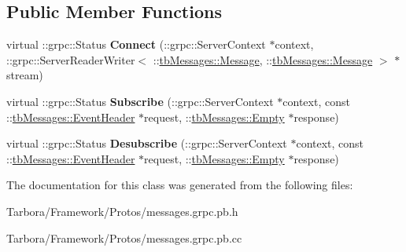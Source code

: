 \subsection*{Public Member Functions}
\begin{DoxyCompactItemize}
\item 
\mbox{\label{classtbMessages_1_1TarboraMessages_1_1Service_adc6d73458f6e4ad3eb72991d44ec21fc}} 
virtual \+::grpc\+::\+Status {\bfseries Connect} (\+::grpc\+::\+Server\+Context $\ast$context, \+::grpc\+::\+Server\+Reader\+Writer$<$ \+::\hyperlink{classtbMessages_1_1Message}{tb\+Messages\+::\+Message}, \+::\hyperlink{classtbMessages_1_1Message}{tb\+Messages\+::\+Message} $>$ $\ast$stream)
\item 
\mbox{\label{classtbMessages_1_1TarboraMessages_1_1Service_a7e095b068cce56fce8f6d952554e8d0e}} 
virtual \+::grpc\+::\+Status {\bfseries Subscribe} (\+::grpc\+::\+Server\+Context $\ast$context, const \+::\hyperlink{classtbMessages_1_1EventHeader}{tb\+Messages\+::\+Event\+Header} $\ast$request, \+::\hyperlink{classtbMessages_1_1Empty}{tb\+Messages\+::\+Empty} $\ast$response)
\item 
\mbox{\label{classtbMessages_1_1TarboraMessages_1_1Service_a63f9842b79525e432430a7d33080f590}} 
virtual \+::grpc\+::\+Status {\bfseries Desubscribe} (\+::grpc\+::\+Server\+Context $\ast$context, const \+::\hyperlink{classtbMessages_1_1EventHeader}{tb\+Messages\+::\+Event\+Header} $\ast$request, \+::\hyperlink{classtbMessages_1_1Empty}{tb\+Messages\+::\+Empty} $\ast$response)
\end{DoxyCompactItemize}


The documentation for this class was generated from the following files\+:\begin{DoxyCompactItemize}
\item 
Tarbora/\+Framework/\+Protos/messages.\+grpc.\+pb.\+h\item 
Tarbora/\+Framework/\+Protos/messages.\+grpc.\+pb.\+cc\end{DoxyCompactItemize}

